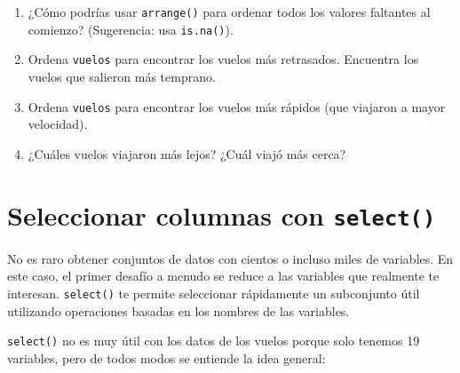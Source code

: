 \documentclass[11pt,oneside]{report}
\begin{document}
\begin{enumerate}
\def\labelenumi{\arabic{enumi}.}
\item
  ¿Cómo podrías usar \texttt{arrange()} para ordenar todos los valores
  faltantes al comienzo? (Sugerencia: usa \texttt{is.na()}).
\item
  Ordena \texttt{vuelos} para encontrar los vuelos más retrasados.
  Encuentra los vuelos que salieron más temprano.
\item
  Ordena \texttt{vuelos} para encontrar los vuelos más rápidos (que
  viajaron a mayor velocidad).
\item
  ¿Cuáles vuelos viajaron más lejos? ¿Cuál viajó más cerca?
\end{enumerate}

\hypertarget{select}{%
\section{\texorpdfstring{Seleccionar columnas con
\texttt{select()}}{Seleccionar columnas con select()}}\label{select}}

No es raro obtener conjuntos de datos con cientos o incluso miles de
variables. En este caso, el primer desafío a menudo se reduce a las
variables que realmente te interesan. \texttt{select()} te permite
seleccionar rápidamente un subconjunto útil utilizando operaciones
basadas en los nombres de las variables.

\texttt{select()} no es muy útil con los datos de los vuelos porque solo
tenemos 19 variables, pero de todos modos se entiende la idea general:
\end{document}
